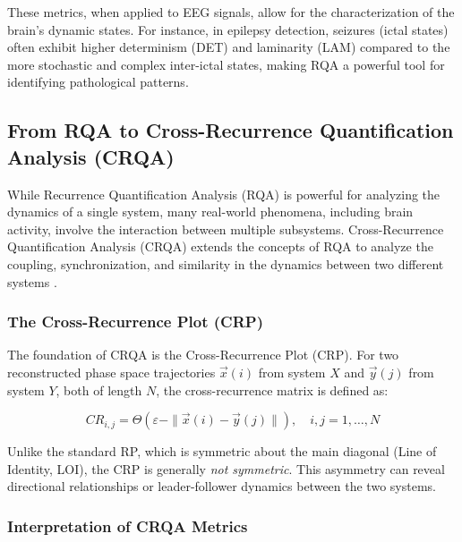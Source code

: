 \documentclass{article}
\begin{document}
					These metrics, when applied to EEG signals, allow for the characterization of the brain's dynamic states. For instance, in epilepsy detection, seizures (ictal states) often exhibit higher determinism (DET) and laminarity (LAM) compared to the more stochastic and complex inter-ictal states, making RQA a powerful tool for identifying pathological patterns.	


				


				\subsection{From RQA to Cross-Recurrence Quantification Analysis (CRQA)}
					\label{subsec:crqa_theory}

					While Recurrence Quantification Analysis (RQA) is powerful for analyzing the dynamics of a single system, many real-world phenomena, including brain activity, involve the interaction between multiple subsystems. Cross-Recurrence Quantification Analysis (CRQA) extends the concepts of RQA to analyze the coupling, synchronization, and similarity in the dynamics between two different systems \cite{marwan2007}.

					\subsubsection{The Cross-Recurrence Plot (CRP)}

					The foundation of CRQA is the Cross-Recurrence Plot (CRP). For two reconstructed phase space trajectories \( \vec{x}(i) \) from system \( X \) and \( \vec{y}(j) \) from system \( Y \), both of length \( N \), the cross-recurrence matrix is defined as:

					\begin{equation}
					CR_{i,j} = \Theta(\varepsilon - \|\vec{x}(i) - \vec{y}(j)\|), \quad i,j = 1, \ldots, N
					\end{equation}

					Unlike the standard RP, which is symmetric about the main diagonal (Line of Identity, LOI), the CRP is generally \emph{not symmetric}. This asymmetry can reveal directional relationships or leader-follower dynamics between the two systems.

					\subsubsection{Interpretation of CRQA Metrics}
\end{document}
